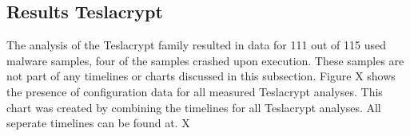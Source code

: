 \documentclass[conference]{IEEEtran}
\begin{document}
\subsection{Results Teslacrypt}
The analysis of the Teslacrypt family resulted in data for 111 out of 115 used malware samples, four of the samples crashed upon execution. These samples are not part of any timelines or charts discussed in this subsection. Figure X shows the presence of configuration data for all measured Teslacrypt analyses. This chart was created by combining the timelines for all Teslacrypt analyses. All seperate timelines can be found at. X




%
%
%
\end{document}
